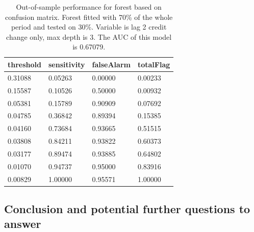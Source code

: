 \documentclass{article}
\begin{document}
\begin{multicols}{2}
\begin{table}[H]
        \caption{Out-of-sample performance for forest based on confusion matrix. Forest fitted with 70\% of the whole period and tested on
        30\%. Variable is lag 2 credit change only,
        max depth is 3. The AUC of this model is 0.67079.}

    \begin{center}\begin{tabular}{|l|l|l|l|}
    \hline
     threshold           & sensitivity        & falseAlarm         & totalFlag            \\ \hline
    0.31088  & 0.05263 & 0.00000                & 0.00233 \\ \hline
    0.15587  & 0.10526 & 0.50000                & 0.00932 \\ \hline
    0.05381   & 0.15789 & 0.90909 & 0.07692  \\ \hline
    0.04785 & 0.36842  & 0.89394 & 0.15385  \\ \hline
    0.04160  & 0.73684  & 0.93665 & 0.51515   \\ \hline
    0.03808  & 0.84211  & 0.93822 & 0.60373   \\ \hline
    0.03177  & 0.89474  & 0.93885 & 0.64802   \\ \hline
    0.01070 & 0.94737  & 0.95000               & 0.83916   \\ \hline
    0.00829  & 1.00000                 & 0.95571 & 1.00000                  \\ \hline
    \end{tabular}\end{center}
\end{table}
\end{multicols}

\subsection*{Conclusion and potential further questions to answer}
\end{document}
